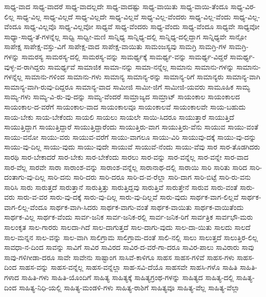 {ಸಾಧ್ಯ-ವಾದ
ಸಾಧ್ಯ-ವಾದರೆ
ಸಾಧ್ಯ-ವಾದಲ್ಲದೇ
ಸಾಧ್ಯ-ವಾದಷ್ಟು
ಸಾಧ್ಯ-ವಾಯಿತು
ಸಾಧ್ಯ-ವಾಯಿ-ತೆಂದೂ
ಸಾಧ್ಯ-ವಿರ-ಲಿಲ್ಲ
ಸಾಧ್ಯ-ವಿಲ್ಲ
ಸಾಧ್ಯ-ವಿಲ್ಲದೆ
ಸಾಧ್ಯ-ವಿಲ್ಲದೇ
ಸಾಧ್ಯ-ವಿಲ್ಲವೆ
ಸಾಧ್ಯ-ವಿಲ್ಲ-ವೆಂದರು
ಸಾಧ್ಯ-ವಿಲ್ಲ-ವೆಂದು
ಸಾಧ್ಯ-ವಿಲ್ಲ-ವೆಂದೂ
ಸಾಧ್ಯ-ವಿಲ್ಲವೊ
ಸಾಧ್ಯ-ವಿಲ್ಲವೋ
ಸಾಧ್ಯವೆ
ಸಾಧ್ಯ-ವೆಂದರು
ಸಾಧ್ಯ-ವೆಂದು
ಸಾಧ್ಯ-ವೆಂದೂ
ಸಾಧ್ಯವೇ
ಸಾಧ್ಯವೋ
ಸಾಧ್ಯಾ-ಸಾಧ್ಯ-ತೆ-ಗಳನ್ನೆಲ್ಲ
ಸಾಧ್ವಿ
ಸಾಧ್ವೀ-ಮಣಿ
ಸಾನ್ನಿಧ್ಯ
ಸಾನ್ನಿಧ್ಯ-ದಲ್ಲಿ
ಸಾನ್ನಿಧ್ಯ-ದಲ್ಲಿದ್ದಾಗ
ಸಾನ್ನಿಧ್ಯವೇ
ಸಾನ್ಪೋ
ಸಾಪೇಕ್ಷ
ಸಾಪೇಕ್ಷ-ವಸ್ತು-ವಿಗೆ
ಸಾಪೇಕ್ಷ-ವಾದ
ಸಾಪೇಕ್ಷ-ವಾಯಿತು
ಸಾಮಂಜಸ್ಯವು
ಸಾಮಗ್ರಿ
ಸಾಮಗ್ರಿ-ಗಳ
ಸಾಮಗ್ರಿ-ಗಳನ್ನು
ಸಾಮರಸ್ಯ
ಸಾಮರಸ್ಯ-ದಲ್ಲಿ
ಸಾಮರಸ್ಯ-ವನ್ನು
ಸಾಮರ್ಥ್ಯಕ್ಕೆ
ಸಾಮರ್ಥ್ಯ-ವನ್ನು
ಸಾಮರ್ಥ್ಯ-ವಿದ್ದರೆ
ಸಾಮರ್ಥ್ಯ-ವುಳ್ಳ-ವ-ರಾಗಿದ್ದರು
ಸಾಮರ್ಥ್ಯವೆ
ಸಾಮಾಜಿಕ
ಸಾಮಾ-ನನ್ನು
ಸಾಮಾ-ನನ್ನೆಲ್ಲ
ಸಾಮಾನು
ಸಾಮಾನು-ಗಳನ್ನು
ಸಾಮಾನು-ಗಳನ್ನೆಲ್ಲ
ಸಾಮಾನು-ಗಳಿಂದ
ಸಾಮಾನು-ಗಳು
ಸಾಮಾನ್ಯ
ಸಾಮಾನ್ಯ-ರನ್ನು
ಸಾಮಾನ್ಯ-ರಿಗೆ
ಸಾಮಾನ್ಯರು
ಸಾಮಾನ್ಯ-ವಾಗಿ
ಸಾಮಾನ್ಯ-ವಾಗಿ-ರುವು-ದಿದ್ದರೂ
ಸಾಮಾನ್ಯ-ವಾದ
ಸಾಮೀಜಿ
ಸಾಮೀ-ಜಿಗೆ
ಸಾಮೀಜಿ-ಯವರು
ಸಾಮೂಹಿಕ
ಸಾಮ್ಯ
ಸಾಮ್ಯ-ಗಳು
ಸಾಮ್ಯ-ವಿ-ರು-ವು-ದನ್ನು
ಸಾಮ್ಯ-ವೆಂದರೆ
ಸಾಮ್ರಾಜ್ಯದ
ಸಾಮ್ರಾಟ್
ಸಾಯಂಕಾಲ
ಸಾಯಂಕಾಲದ
ಸಾಯಂಕಾಲ-ದ-ವರೆಗೆ
ಸಾಯಂಕಾಲ-ವಾದ
ಸಾಯಂಕಾಲವೂ
ಸಾಯಂಕಾಲವೆ
ಸಾಯಂಕಾಲವೇ
ಸಾಯ-ಬಹುದು
ಸಾಯ-ಬೇಕು
ಸಾಯ-ಬೇಕೆಂದು
ಸಾಯಲಿ
ಸಾಯಲು
ಸಾಯಲೇ
ಸಾಯಿ-ಸಿದರೂ
ಸಾಯುತ್ತಾರೆ
ಸಾಯುತ್ತಿದೆ
ಸಾಯುತ್ತಿದ್ದಾಗ
ಸಾಯುತ್ತಿದ್ದಾರೆ
ಸಾಯುತ್ತಿದ್ದಾರೆಂದು
ಸಾಯುತ್ತಿರು-ವಾಗ
ಸಾಯುತ್ತಿರು-ವೆನು
ಸಾಯುವ
ಸಾಯು-ವಂತೆ
ಸಾಯು-ವನೋ
ಸಾಯು-ವರು
ಸಾಯುವ-ವರೆಗೆ
ಸಾಯು-ವಾಗಲೂ
ಸಾಯು-ವಿರಿ
ಸಾಯುವು-ದಕ್ಕೆ
ಸಾಯು-ವು-ದನ್ನು
ಸಾಯು-ವು-ದಿಲ್ಲ
ಸಾಯು-ವುದು
ಸಾಯು-ವುದೇ
ಸಾಯುವೆ
ಸಾಯುವೆ-ನೆಂದು
ಸಾಯು-ವೆವು
ಸಾರ
ಸಾರ-ತೊಡಗಿದರು
ಸಾರಥಿ
ಸಾರ-ಬೇಕಾದರೆ
ಸಾರ-ಬೇಕು
ಸಾರ-ಬೇಕೆಂದು
ಸಾರಲು
ಸಾರ-ವನ್ನು
ಸಾರ-ವನ್ನೆಲ್ಲ
ಸಾರ-ವನ್ನೇ
ಸಾರ-ವಾದ
ಸಾರ-ವೆಲ್ಲ
ಸಾರವೇ
ಸಾರಾ
ಸಾರಾಂಶ-ವನ್ನು
ಸಾರಾಂಶ-ವನ್ನೆಲ್ಲ
ಸಾರಾನಾಥ-ದಲ್ಲಿ
ಸಾರಾಯಿ
ಸಾರಿ
ಸಾರಿತು
ಸಾರಿದ
ಸಾರಿ-ದಂತಾಗು-ವು-ದಿಲ್ಲ
ಸಾರಿ-ದನು
ಸಾರಿ-ದರು
ಸಾರಿ-ದರೂ
ಸಾರಿ-ದ-ವ-ರೆಲ್ಲಾ
ಸಾರಿ-ದಾಗ
ಸಾರಿ-ಬಿಟ್ಟೆ
ಸಾರಿ-ರು-ವನು
ಸಾರಿಸಿ
ಸಾರು
ಸಾರುತ್ತದೆ
ಸಾರುತ್ತಾನೆ
ಸಾರುತ್ತಿತ್ತು
ಸಾರುತ್ತಿದ್ದವು
ಸಾರುತ್ತಿವೆ
ಸಾರುತ್ತೇನೆ
ಸಾರುವ
ಸಾರು-ವಂತೆ
ಸಾರು-ವರು
ಸಾರು-ವ-ವರ
ಸಾರು-ವು-ದಕ್ಕೆ
ಸಾರು-ವು-ದಿಲ್ಲ
ಸಾರು-ವು-ದಿಲ್ಲವೆ
ಸಾರು-ವುದು
ಸಾರ್ಥಕ-ವಾಗ-ಲಿಲ್ಲವೆ
ಸಾರ್ಥಕ-ವಾಗ-ಲಿಲ್ಲ-ವೆಂದೂ
ಸಾರ್ಥಕ-ವಾಗಿ-ಸಿದರು
ಸಾರ್ಥಕ-ವಾಗು-ವಂತೆ
ಸಾರ್ಥಕ-ವಾಯಿತು
ಸಾರ್ಥಕ-ವಾಯಿತೆಂದು
ಸಾರ್ಥಕ-ವಿಲ್ಲ
ಸಾರ್ಥಕ-ವೆಂದು
ಸಾರ್ವ-ಜನಿಕ
ಸಾರ್ವ-ಜನಿಕ-ರಲ್ಲಿ
ಸಾರ್ವ-ಜನಿಕ-ರಿಗೆ
ಸಾರ್ವತ್ರಿಕ
ಸಾರ್ವಭೌ-ಮರು
ಸಾಲಂಕೃತ
ಸಾಲ-ಗಾರರು
ಸಾಲದಾ-ಗಿದೆ
ಸಾಲ-ದಾಗುತ್ತದೆ
ಸಾಲ-ದಾಗು-ವುದು
ಸಾಲ-ದಾ-ಯಿತು
ಸಾಲದು
ಸಾಲದೆ
ಸಾಲ-ಮನ್ನನ
ಸಾಲ-ವನ್ನು
ಸಾಲ-ವಾಗಿ
ಸಾಲಿಗ್ರಾಮ
ಸಾಲಿಗ್ರಾಮ-ದಂತೆ
ಸಾಲಿ-ನಲ್ಲಿ
ಸಾಲು
ಸಾಲುತ್ತದೆ
ಸಾಲುತ್ತಿರ-ಲಿಲ್ಲ
ಸಾವಧಾ-ನ-ದಿಂದ
ಸಾವನ್ನು
ಸಾವಿಗೆ
ಸಾವಿರ
ಸಾವಿರದ
ಸಾವಿರ-ದ-ವರೆ-ಗಾ-ದರೂ
ಸಾವಿರ-ಪಾಲು
ಸಾವಿರಾರು
ಸಾವು
ಸಾವು-ಗಳಿಗೀಡಾ-ದರೂ
ಸಾವೇ
ಸಾವೇನು
ಸಾಷ್ಟಾಂಗ
ಸಾಸಿವೆ-ಕಾಳಿಗೂ
ಸಾಹಸ
ಸಾಹಸ-ಗಳಿವೆ
ಸಾಹಸ-ಗಳು
ಸಾಹಸ-ದಿಂದ
ಸಾಹಸ-ವನ್ನು
ಸಾಹಸ-ವನ್ನೆಲ್ಲ
ಸಾಹಸ-ವನ್ನೆಲ್ಲಾ
ಸಾಹ-ಸವಿ-ದೆಯೊ
ಸಾಹಸವೇ
ಸಾಹಸಿ-ಗಳೊ
ಸಾಹಿತಿ
ಸಾಹಿತಿ-ಗಳಾದ
ಸಾಹಿತಿ-ಗಳು
ಸಾಹಿತಿ-ಯೊಂದಿಗೆ
ಸಾಹಿತ್ಯ
ಸಾಹಿತ್ಯಕ್ಕೆ
ಸಾಹಿತ್ಯಗ್ರಂಥ-ಗಳನ್ನು
ಸಾಹಿತ್ಯದ
ಸಾಹಿತ್ಯ-ದಲ್ಲಿ
ಸಾಹಿತ್ಯ-ದಿಂದ
ಸಾಹಿತ್ಯ-ನಿಧಿ-ಯಲ್ಲಿ
ಸಾಹಿತ್ಯ-ಮಂಡಳಿ-ಗಳು
ಸಾಹಿತ್ಯ-ರಾಶಿಗೆ
ಸಾಹಿತ್ಯವೂ
ಸಾಹಿತ್ಯ-ವೆಲ್ಲ
ಸಾಹಿತ್ಯ-ವೆಲ್ಲಾ
}

